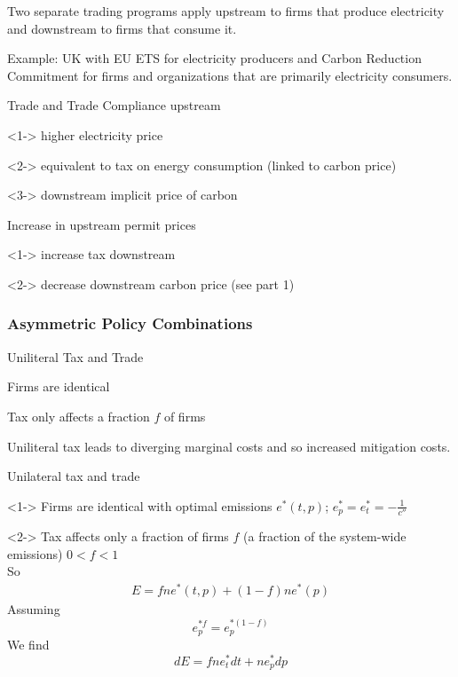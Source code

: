 	Two separate trading programs apply upstream to firms that produce electricity and downstream to firms that consume it.


	Example: UK with EU ETS for electricity producers and Carbon Reduction Commitment for firms and organizations that are primarily electricity consumers.





{Trade and Trade}
Compliance upstream






	<1-> higher electricity price


	<2-> equivalent to tax on energy consumption (linked to carbon price)


	<3-> downstream implicit price of carbon




Increase in upstream permit prices






	<1-> increase tax downstream


	<2-> decrease downstream carbon price (see part 1)





\subsubsection{Asymmetric Policy Combinations}

{Uniliteral Tax and Trade}






	Firms are identical


	Tax only affects a fraction $f$ of firms


	Uniliteral tax leads to diverging marginal costs and so increased mitigation costs.





{Unilateral tax and trade}






	<1-> Firms are identical with optimal emissions $e^*(t,p)$; $e^*_p = e^*_t = -\frac{1}{c''}$


	<2-> Tax affects only a fraction of firms $f$ (a fraction of the system-wide emissions) $0 < f < 1$ \\
 So
\begin{align}
E = fne^*(t,p)+(1-f)ne^*(p)
\end{align}
Assuming
\[
e^{*f}_p = e^{*(1-f)}_p
\]
We find
\[
dE = fne^*_tdt+ne^*_pdp
\]


